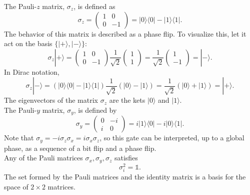 \documentclass[a4paper]{article}
\begin{document}
The Pauli-$z$ matrix, $\sigma_z$, is defined as
\begin{equation}
\sigma_z=
	\begin{pmatrix}
		1 &0 \\
		0 &-1
	\end{pmatrix}=|0\rangle\langle 0|-|1\rangle\langle 1|.
\end{equation}
The behavior of this matrix is described as a phase flip. To visualize this, let it act on the basis $\{|+\rangle, |-\rangle\}$:
\begin{equation}
\sigma_z|+\rangle=
	\begin{pmatrix}
		1 &0 \\
		0 &-1
	\end{pmatrix}\frac{1}{\sqrt{2}}
	\begin{pmatrix}
		1 \\
		1
	\end{pmatrix}=\frac{1}{\sqrt{2}}
	\begin{pmatrix}
		1 \\
		-1
	\end{pmatrix}=|-\rangle.
\end{equation}
In Dirac notation,
\begin{equation}
\sigma_z|-\rangle=(|0\rangle\langle 0|-|1\rangle\langle 1|)\frac{1}{\sqrt{2}}(|0\rangle-|1\rangle)=\frac{1}{\sqrt{2}}(|0\rangle+|1\rangle)=|+\rangle.
\end{equation}
The eigenvectors of the matrix $\sigma_z$ are the kets $|0\rangle$ and $|1\rangle$.\\

The Pauli-$y$ matrix, $\sigma_y$, is defined by
\begin{equation}
\sigma_y=
	\begin{pmatrix}
		0 &-i \\
		i & 0
	\end{pmatrix}=i|1\rangle\langle 0|-i|0\rangle\langle 1|.
\end{equation}
Note that $\sigma_y=-i \sigma_z\sigma_x=i\sigma_x\sigma_z$, so this gate can be interpreted, up to a global phase, as a sequence of a bit flip and a phase flip.\\
Any of the Pauli matrices $\sigma_x, \sigma_y, \sigma_z$ satisfies
\begin{equation}
\sigma_i^2=\mathbb{1}.
\end{equation}
The set formed by the Pauli matrices and the identity matrix is a basis for the space of $2\times2$ matrices.
\end{document}
